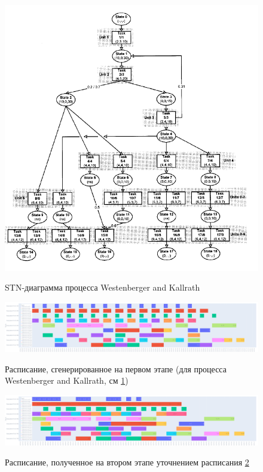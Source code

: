 \documentclass[12pt, twoside]{article}
\theoremstyle{definition}
\begin{document}
\begin{figure}[h]
\caption{STN-диаграмма процесса Westenberger and Kallrath}
\centering
\includegraphics[width=1.0\textwidth]{wbstn}
\label{fig:wbstn}
\end{figure}

\begin{figure}[h]
\caption{Расписание, сгенерированное на первом этапе (для процесса Westenberger and Kallrath, см \ref{fig:wbstn})}
\centering
\includegraphics[width=1.0\textwidth]{wbplan}
\label{fig:first_phase_wb}
\end{figure}

\begin{figure}[h]
\caption{Расписание, полученное на втором этапе уточнением расписания \ref{fig:first_phase_wb}}
\centering
\includegraphics[width=1.0\textwidth]{wbplancorr}
\label{fig:second_phase_wb}
\end{figure}
\end{document}
